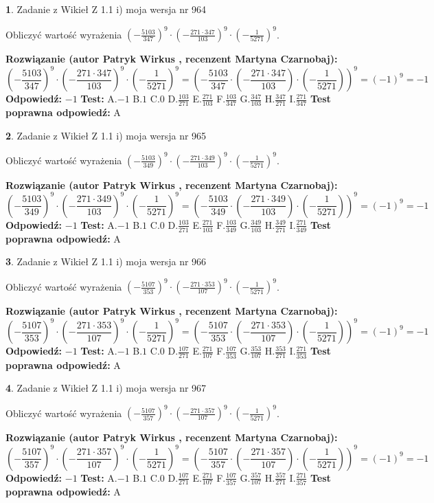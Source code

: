 \documentclass[12pt, a4paper]{article}
\theoremstyle{definition} %
\newtheorem{zad}{}
\newcommand{\zadStart}[1]{\begin{zad}#1\newline}
\newcommand{\zadStop}{\end{zad}}
\newcommand{\rozwStart}[2]{\noindent \textbf{Rozwiązanie (autor #1 , recenzent #2): }\newline}
\newcommand{\rozwStop}{\newline}
\newcommand{\odpStart}{\noindent \textbf{Odpowiedź:}\newline}
\newcommand{\odpStop}{\newline}
\newcommand{\testStart}{\noindent \textbf{Test:}\newline}
\newcommand{\testStop}{\newline}
\newcommand{\kluczStart}{\noindent \textbf{Test poprawna odpowiedź:}\newline}
\newcommand{\kluczStop}{\newline}
\begin{document}
\zadStart{Zadanie z Wikieł Z 1.1 i) moja wersja nr 964}

Obliczyć wartość wyrażenia $(-\frac{5103}{347})^{9} \cdot (-\frac{271 \cdot 347}{103})^{9} \cdot (-\frac{1}{5271})^{9}$.
\zadStop
\rozwStart{Patryk Wirkus}{Martyna Czarnobaj}
$$(-\frac{5103}{347})^{9} \cdot (-\frac{271 \cdot 347}{103})^{9} \cdot (-\frac{1}{5271})^{9} = (-\frac{5103}{347} \cdot (-\frac{271 \cdot 347}{103}) \cdot (-\frac{1}{5271}))^{9} = (-1)^{9} = -1$$
\rozwStop
\odpStart
$-1$
\odpStop
\testStart
A.$-1$ B.$1$ C.$0$ D.$\frac{103}{271}$ E.$\frac{271}{103}$
F.$\frac{103}{347}$ G.$\frac{347}{103}$
H.$\frac{347}{271}$
I.$\frac{271}{347}$
\testStop
\kluczStart
A
\kluczStop



\zadStart{Zadanie z Wikieł Z 1.1 i) moja wersja nr 965}

Obliczyć wartość wyrażenia $(-\frac{5103}{349})^{9} \cdot (-\frac{271 \cdot 349}{103})^{9} \cdot (-\frac{1}{5271})^{9}$.
\zadStop
\rozwStart{Patryk Wirkus}{Martyna Czarnobaj}
$$(-\frac{5103}{349})^{9} \cdot (-\frac{271 \cdot 349}{103})^{9} \cdot (-\frac{1}{5271})^{9} = (-\frac{5103}{349} \cdot (-\frac{271 \cdot 349}{103}) \cdot (-\frac{1}{5271}))^{9} = (-1)^{9} = -1$$
\rozwStop
\odpStart
$-1$
\odpStop
\testStart
A.$-1$ B.$1$ C.$0$ D.$\frac{103}{271}$ E.$\frac{271}{103}$
F.$\frac{103}{349}$ G.$\frac{349}{103}$
H.$\frac{349}{271}$
I.$\frac{271}{349}$
\testStop
\kluczStart
A
\kluczStop



\zadStart{Zadanie z Wikieł Z 1.1 i) moja wersja nr 966}

Obliczyć wartość wyrażenia $(-\frac{5107}{353})^{9} \cdot (-\frac{271 \cdot 353}{107})^{9} \cdot (-\frac{1}{5271})^{9}$.
\zadStop
\rozwStart{Patryk Wirkus}{Martyna Czarnobaj}
$$(-\frac{5107}{353})^{9} \cdot (-\frac{271 \cdot 353}{107})^{9} \cdot (-\frac{1}{5271})^{9} = (-\frac{5107}{353} \cdot (-\frac{271 \cdot 353}{107}) \cdot (-\frac{1}{5271}))^{9} = (-1)^{9} = -1$$
\rozwStop
\odpStart
$-1$
\odpStop
\testStart
A.$-1$ B.$1$ C.$0$ D.$\frac{107}{271}$ E.$\frac{271}{107}$
F.$\frac{107}{353}$ G.$\frac{353}{107}$
H.$\frac{353}{271}$
I.$\frac{271}{353}$
\testStop
\kluczStart
A
\kluczStop



\zadStart{Zadanie z Wikieł Z 1.1 i) moja wersja nr 967}

Obliczyć wartość wyrażenia $(-\frac{5107}{357})^{9} \cdot (-\frac{271 \cdot 357}{107})^{9} \cdot (-\frac{1}{5271})^{9}$.
\zadStop
\rozwStart{Patryk Wirkus}{Martyna Czarnobaj}
$$(-\frac{5107}{357})^{9} \cdot (-\frac{271 \cdot 357}{107})^{9} \cdot (-\frac{1}{5271})^{9} = (-\frac{5107}{357} \cdot (-\frac{271 \cdot 357}{107}) \cdot (-\frac{1}{5271}))^{9} = (-1)^{9} = -1$$
\rozwStop
\odpStart
$-1$
\odpStop
\testStart
A.$-1$ B.$1$ C.$0$ D.$\frac{107}{271}$ E.$\frac{271}{107}$
F.$\frac{107}{357}$ G.$\frac{357}{107}$
H.$\frac{357}{271}$
I.$\frac{271}{357}$
\testStop
\kluczStart
A
\kluczStop
\end{document}
